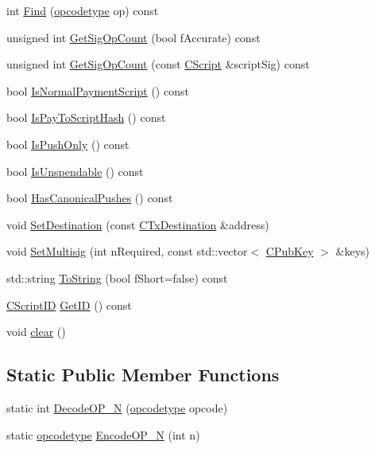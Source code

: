\begin{DoxyCompactItemize}
int \hyperlink{class_c_script_af38dbc6bf2023f49eca4a4106f88fb32}{Find} (\hyperlink{script_8h_a63e349a6089a54da9fe09a3d858648bd}{opcodetype} op) const 
\item 
unsigned int \hyperlink{class_c_script_ad4a8173c235111e93a8171b1f8d00ce8}{Get\+Sig\+Op\+Count} (bool f\+Accurate) const 
\item 
unsigned int \hyperlink{class_c_script_a81b6b6515acc42ce4fdf889ed94b9a00}{Get\+Sig\+Op\+Count} (const \hyperlink{class_c_script}{C\+Script} \&script\+Sig) const 
\item 
bool \hyperlink{class_c_script_a2b3ee98f7a63916b67b91dfd2c4ee312}{Is\+Normal\+Payment\+Script} () const 
\item 
bool \hyperlink{class_c_script_acba6d6d35776de4ce3a632446f44805f}{Is\+Pay\+To\+Script\+Hash} () const 
\item 
bool \hyperlink{class_c_script_a0a29e513d962967c4351828780ab4d9f}{Is\+Push\+Only} () const 
\item 
bool \hyperlink{class_c_script_a5d8efd005dde9242d88212c8b7fdb696}{Is\+Unspendable} () const 
\item 
bool \hyperlink{class_c_script_afb9f817abc9674ab0278b0eb32d10c39}{Has\+Canonical\+Pushes} () const 
\item 
void \hyperlink{class_c_script_ad1b5a9077241aa06116040c4f1b7c31e}{Set\+Destination} (const \hyperlink{keystore_8h_a8f46ecba0ddeb036be6b58d6ed1909cd}{C\+Tx\+Destination} \&address)
\item 
void \hyperlink{class_c_script_a1bb2091fd110a07fabed259b94589227}{Set\+Multisig} (int n\+Required, const std\+::vector$<$ \hyperlink{class_c_pub_key}{C\+Pub\+Key} $>$ \&keys)
\item 
std\+::string \hyperlink{class_c_script_a391abaa856cf8511bc840fef949839d9}{To\+String} (bool f\+Short=false) const 
\item 
\hyperlink{class_c_script_i_d}{C\+Script\+I\+D} \hyperlink{class_c_script_a59fd961e1b74202a0951a077b576c0ba}{Get\+I\+D} () const 
\item 
void \hyperlink{class_c_script_a7b2baf842621f07c4939408acf63377c}{clear} ()
\end{DoxyCompactItemize}
\subsection*{Static Public Member Functions}
\begin{DoxyCompactItemize}
\item 
static int \hyperlink{class_c_script_a7f975fca06b3e9a17da8ba23c7647e2e}{Decode\+O\+P\+\_\+\+N} (\hyperlink{script_8h_a63e349a6089a54da9fe09a3d858648bd}{opcodetype} opcode)
\item 
static \hyperlink{script_8h_a63e349a6089a54da9fe09a3d858648bd}{opcodetype} \hyperlink{class_c_script_ae81b29e2e86343bedacfd4e0ef87bca6}{Encode\+O\+P\+\_\+\+N} (int n)
\end{DoxyCompactItemize}
